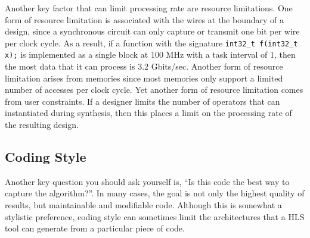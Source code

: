 
%


Another key factor that can limit processing rate are resource limitations.  One form of resource limitation is associated with the wires at the boundary of a design, since a synchronous circuit can only capture or transmit one bit per wire per clock cycle.  As a result, if a function with the signature \lstinline|int32_t f(int32_t x);| is implemented as a single block at 100 MHz with a task interval of 1, then the most data that it can process is 3.2 Gbits/sec. Another form of resource limitation arises from memories since most memories only support a limited number of accesses per clock cycle.  Yet another form of resource limitation comes from user constraints.  If a designer limits the number of operators that can instantiated during synthesis, then this places a limit on the processing rate of the resulting design.

%

\subsection{Coding Style}

Another key question you should ask yourself is, ``Is this code the best way to capture the algorithm?''.  In many cases, the goal is not only the highest quality of results, but maintainable and modifiable code.  Although this is somewhat a stylistic preference, coding style can sometimes limit the architectures that a HLS tool can generate from a particular piece of code.


